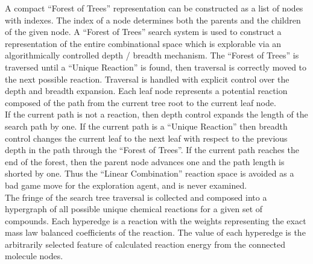 \documentclass{article}
\begin{document}
A compact ``Forest of Trees'' representation can be constructed as a list of nodes with indexes. The index of a node determines both the parents and the children of the given node. A ``Forest of Trees'' search system is used to construct a representation of the entire combinational space which is explorable via an algorithmically controlled depth / breadth mechanism. The ``Forest of Trees'' is traversed until a ``Unique Reaction'' is found, then traversal is correctly moved to the next possible reaction. Traversal is handled with explicit control over the depth and breadth expansion. Each leaf node represents a potential reaction composed of the path from the current tree root to the current leaf node.\\

 If the current path is not a reaction, then depth control expands the length of the search path by one. If the current path is a ``Unique Reaction'' then breadth control changes the current leaf to the next leaf with respect to the previous depth in the path through the ``Forest of Trees''. If the current path reaches the end of the forest, then the parent node advances one and the path length is shorted by one. Thus the ``Linear Combination'' reaction space is avoided as a bad game move for the exploration agent, and is never examined. \\
 
  The fringe of the search tree traversal is collected and composed into a hypergraph of all possible unique chemical reactions for a given set of compounds. Each hyperedge is a reaction with the weights representing the exact mass law balanced coefficients of the reaction. The value of each hyperedge is the arbitrarily selected feature of calculated reaction energy from the connected molecule nodes. \\
\end{document}
